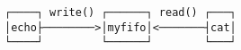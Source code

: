 \documentclass[varwidth,crop]{standalone}
\begin{document}
\begin{verbatim}
┌────┐ write() ┌──────┐ read() ┌───┐
│echo├────────>│myfifo│<───────┤cat│
└────┘         └──────┘        └───┘
\end{verbatim}
\end{document}
